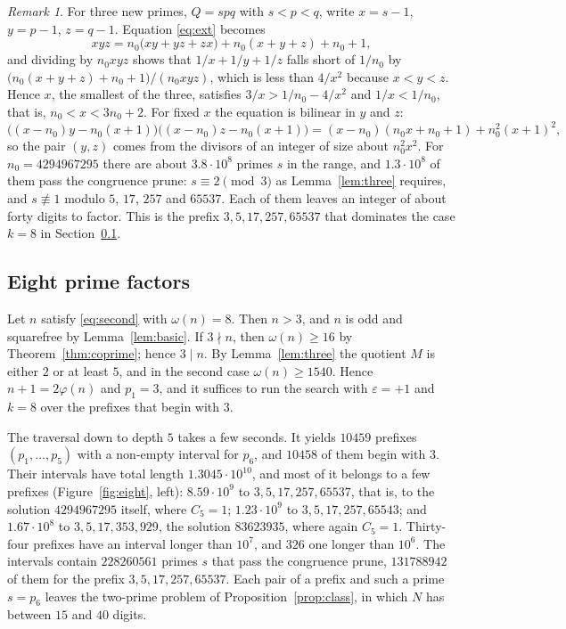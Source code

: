 \documentclass[screen,reqno]{aomart}
\numberwithin{equation}{section}
\theoremstyle{plain}
\theoremstyle{definition}
\theoremstyle{remark}
\newtheorem{remark}[theorem]{Remark}
\begin{document}
\begin{remark}\label{rem:three}
For three new primes, $Q=spq$ with $s<p<q$, write $x=s-1$, $y=p-1$, $z=q-1$.
Equation \eqref{eq:ext} becomes
\[
  xyz=n_0\bigl(xy+yz+zx\bigr)+n_0(x+y+z)+n_0+1 ,
\]
and dividing by $n_0xyz$ shows that $1/x+1/y+1/z$ falls short of
$1/n_0$ by $\bigl(n_0(x+y+z)+n_0+1\bigr)/(n_0xyz)$, which is less than
$4/x^2$ because $x<y<z$. Hence $x$, the smallest of the three,
satisfies $3/x>1/n_0-4/x^2$ and $1/x<1/n_0$, that is,
$n_0<x<3n_0+2$. For
fixed $x$ the equation is bilinear in $y$ and $z$:
\[
  \bigl((x-n_0)y-n_0(x+1)\bigr)\bigl((x-n_0)z-n_0(x+1)\bigr)
  =(x-n_0)(n_0x+n_0+1)+n_0^2(x+1)^2 ,
\]
so the pair $(y,z)$ comes from the divisors of an integer of size about
$n_0^2x^2$. For $n_0=4294967295$ there are about $3.8\cdot10^8$
primes $s$ in the range, and $1.3\cdot10^8$ of them pass the
congruence prune: $s\equiv2\pmod3$ as Lemma~\ref{lem:three} requires,
and $s\not\equiv1$ modulo $5$, $17$, $257$ and $65537$. Each of them
leaves an integer of about forty digits to factor. This is the prefix $3,5,17,257,65537$ that
dominates the case $k=8$ in Section~\ref{sec:eight}.
\end{remark}

\subsection{Eight prime factors}\label{sec:eight}
Let $n$ satisfy \eqref{eq:second} with $\omega(n)=8$. Then $n>3$, and
$n$ is odd and squarefree by Lemma~\ref{lem:basic}. If $3\nmid n$, then
$\omega(n)\ge16$ by Theorem~\ref{thm:coprime}; hence $3\mid n$. By
Lemma~\ref{lem:three} the quotient $M$ is either $2$ or at least $5$,
and in the second case $\omega(n)\ge1540$. Hence $n+1=2\varphi(n)$ and
$p_1=3$, and it suffices to run the search with $\varepsilon=+1$ and
$k=8$ over the prefixes that begin with $3$.

The traversal down to depth $5$ takes a few seconds. It yields $10459$
prefixes $(p_1,\dots,p_5)$ with a non-empty interval for $p_6$, and
$10458$ of them begin with $3$. Their intervals have total length
$1.3045\cdot10^{10}$, and most of it belongs to a few prefixes
(Figure~\ref{fig:eight}, left): $8.59\cdot10^9$ to $3,5,17,257,65537$,
that is, to the solution $4294967295$ itself, where $C_5=1$;
$1.23\cdot10^9$ to $3,5,17,257,65543$; and $1.67\cdot10^8$ to
$3,5,17,353,929$, the solution $83623935$, where again $C_5=1$.
Thirty-four prefixes have an interval longer than $10^7$, and $326$
one longer than $10^6$. The intervals contain $228260561$ primes $s$ that
pass the congruence prune, $131788942$ of them for the prefix
$3,5,17,257,65537$. Each pair of a prefix and such a prime $s=p_6$
leaves the two-prime problem of Proposition~\ref{prop:class}, in which
$N$ has between $15$ and $40$ digits.
\end{document}
